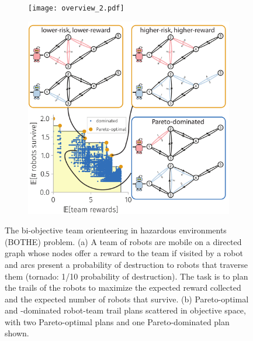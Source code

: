 \documentclass[fleqn,10pt,lineno]{wlpeerj}
\begin{document}
\begin{figure}[h!]
    \centering
     \begin{subfigure}[b]{0.62\textwidth}
    	\texttt{[image: overview\_2.pdf]}
	\caption{} \label{fig:overview}
    \end{subfigure}
    \begin{subfigure}[b]{0.66\textwidth}
    	\includegraphics[width=\textwidth]{toy_pareto_front2.pdf}
	\caption{} \label{fig:pareto_optimal}
    \end{subfigure}
    \caption{
      The bi-objective team orienteering in hazardous environments (BOTHE) problem.
      (a) A team of robots are mobile on a directed graph whose 
      nodes offer a reward to the team if visited by a robot and 
      arcs present a probability of destruction to robots that traverse them (tornado: 1/10 probability of destruction). The task is to plan the trails of the robots to maximize the expected reward collected and the expected number of robots that survive.
      (b) Pareto-optimal and -dominated robot-team trail plans scattered in objective space, with two Pareto-optimal plans and one Pareto-dominated plan shown.}
\end{figure}
\end{document}
